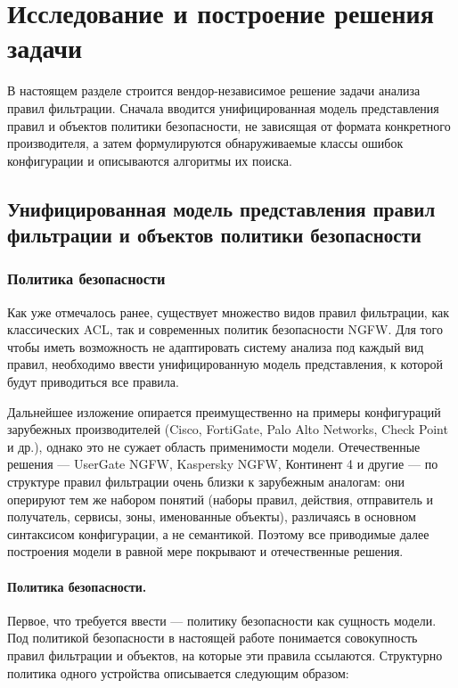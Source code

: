 \section{Исследование и построение решения задачи}
\label{sec:Section3} 

В настоящем разделе строится вендор-независимое решение задачи анализа правил фильтрации. Сначала вводится унифицированная модель представления правил и объектов политики безопасности, не зависящая от формата конкретного производителя, а затем формулируются обнаруживаемые классы ошибок конфигурации и описываются алгоритмы их поиска.

\subsection{Унифицированная модель представления правил фильтрации и объектов политики безопасности}
\label{sec:Section3:model}

\subsubsection{Политика безопасности}

Как уже отмечалось ранее, существует множество видов правил фильтрации, как классических ACL, так и современных политик безопасности NGFW. Для того чтобы иметь возможность не адаптировать систему анализа под каждый вид правил, необходимо ввести унифицированную модель представления, к которой будут приводиться все правила.

Дальнейшее изложение опирается преимущественно на примеры конфигураций зарубежных производителей (Cisco, FortiGate, Palo Alto Networks, Check Point и др.), однако это не сужает область применимости модели. Отечественные решения --- UserGate NGFW, Kaspersky NGFW, Континент 4 и другие --- по структуре правил фильтрации очень близки к зарубежным аналогам: они оперируют тем же набором понятий (наборы правил, действия, отправитель и получатель, сервисы, зоны, именованные объекты), различаясь в основном синтаксисом конфигурации, а не семантикой. Поэтому все приводимые далее построения модели в равной мере покрывают и отечественные решения.

\paragraph{Политика безопасности.} Первое, что требуется ввести --- политику безопасности как сущность модели. Под политикой безопасности в настоящей работе понимается совокупность правил фильтрации и объектов, на которые эти правила ссылаются. Структурно политика одного устройства  описывается следующим образом:

